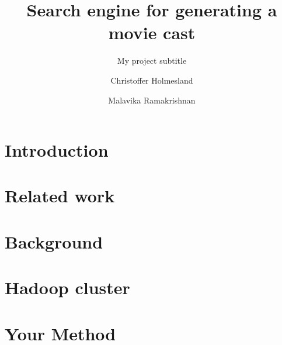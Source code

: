 \documentclass[sigconf]{acmart}
\begin{document}
\title{Search engine for generating a movie cast}
\subtitle{My project subtitle}

\author{Christoffer Holmesland}

\author{Malavika Ramakrishnan}



\begin{abstract}

\end{abstract}


\maketitle


\section{Introduction}
\label{sec:introduction}


\section{Related work}
\label{sec:relatedwork}


\section{Background}
\label{sec:background}


\section{Hadoop cluster}
\label{sec:hadoop}


\section{Your Method}
\label{sec:method}

\end{document}
